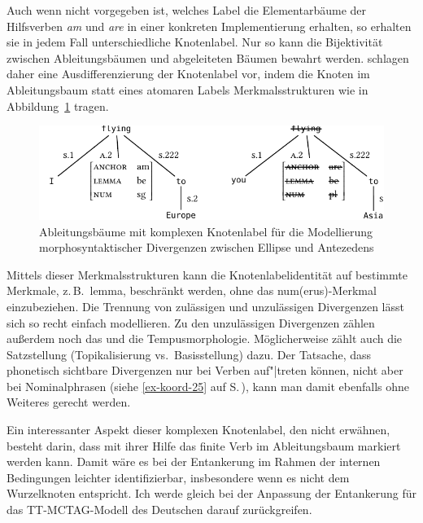 Auch wenn nicht vorgegeben ist, welches Label die Elementarbäume der Hilfsverben {\it am} und {\it are} in einer konkreten Implementierung erhalten, so erhalten sie in jedem Fall unterschiedliche Knotenlabel. Nur so kann die Bijektivität zwischen Ableitungsbäumen und abgeleiteten Bäumen bewahrt werden. 
\cite{Lichte:Kallmeyer:10} schlagen daher eine Ausdifferenzierung der Knotenlabel vor, indem die Knoten im Ableitungsbaum statt eines atomaren Labels Merkmalsstrukturen wie in Abbildung~\ref{fig-deanchoring-9} tragen. 
\begin{figure}[t]
\centering
\includegraphics{graphics/abb822.pdf}
\caption{\label{fig-deanchoring-9}Ableitungsbäume mit komplexen Knotenlabel für die Modellierung morphosyntaktischer Divergenzen zwischen Ellipse und Antezedens \citep[(7)]{Lichte:Kallmeyer:10}}
\end{figure}
Mittels dieser Merkmalsstrukturen kann die Knotenlabelidentität auf bestimmte Merkmale, z.\,B.\ {\sc lemma}, beschränkt werden, ohne das {\sc num(erus)}-Merkmal einzubeziehen. Die Trennung von zulässigen und unzulässigen Divergenzen lässt sich so recht einfach modellieren. Zu den unzulässigen Divergenzen zählen \cite{Lichte:Kallmeyer:10} au\ss erdem noch das  und die Tempusmorphologie. Möglicherweise zählt auch die Satzstellung (Topikalisierung vs.\ Basisstellung) dazu. Der Tatsache, dass phonetisch sichtbare Divergenzen nur bei Verben auf"|treten können, nicht aber bei Nominalphrasen (siehe \ref{ex-koord-25} auf S.\,\pageref{ex-koord-25}), kann man damit ebenfalls ohne Weiteres gerecht werden.

Ein interessanter Aspekt dieser komplexen Knotenlabel, den \cite{Lichte:Kallmeyer:10} nicht erwähnen, besteht darin, dass mit ihrer Hilfe das finite Verb im Ableitungsbaum markiert werden kann. Damit wäre es bei der Entankerung im Rahmen der internen Bedingungen leichter identifizierbar, insbesondere wenn es nicht dem Wurzelknoten entspricht. Ich werde gleich bei der Anpassung der Entankerung für das TT-MCTAG-Modell des Deutschen darauf zurückgreifen.

